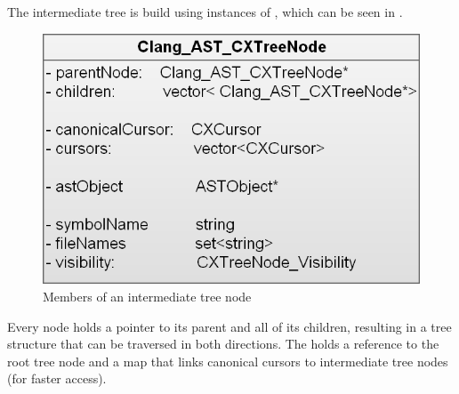 The intermediate tree is build using instances of , which can be seen in . 

\begin{figure}[h] %
	\centering
		\includegraphics[scale=0.3]{Images/CXTreeNode.png}
	\caption{Members of an intermediate tree node}
	\label{fig:CXTreeNode}
\end{figure}

Every node holds a pointer to its parent and all of its children, resulting in a tree structure that can be traversed in both directions. 
The  holds a reference to the root tree node and a map that links canonical cursors to intermediate tree nodes (for faster access).

